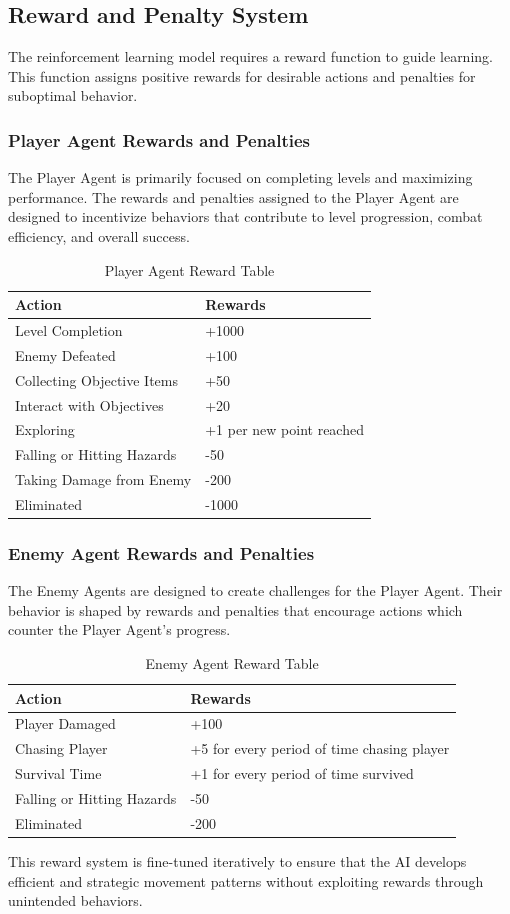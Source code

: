 \documentclass[12pt,oneside,openright,a4paper]{cpe-english-project}
\begin{document}
\subsection{Reward and Penalty System}
The reinforcement learning model requires a reward function to guide learning. This function assigns positive rewards for desirable actions and penalties for suboptimal behavior.
\subsubsection{Player Agent Rewards and Penalties}
The Player Agent is primarily focused on completing levels and maximizing performance. The rewards and penalties assigned to the Player Agent are designed to incentivize behaviors that contribute to level progression, combat efficiency, and overall success.\par
\begin{table}[!h]
\caption{Player Agent Reward Table}\label{tbl:Player Agent Reward Table}
\begin{tabular}{|l|l|} \hline
\textbf{Action} & \textbf{Rewards} \\ \hline
Level Completion & +1000 \\ 
Enemy Defeated & +100 \\ 
Collecting Objective Items & +50 \\ 
Interact with Objectives & +20 \\ 
Exploring & +1 per new point reached \\ 
Falling or Hitting Hazards & -50 \\ 
Taking Damage from Enemy & -200 \\
Eliminated & -1000 \\ \hline
\end{tabular}
\end{table}
\subsubsection{Enemy Agent Rewards and Penalties}
The Enemy Agents are designed to create challenges for the Player Agent. Their behavior is shaped by rewards and penalties that encourage actions which counter the Player Agent's progress.\par
\begin{table}[!h]
\caption{Enemy Agent Reward Table}\label{tbl:Enemy Agent Reward Table}
\begin{tabular}{|l|l|} \hline
\textbf{Action} & \textbf{Rewards} \\ \hline
Player Damaged & +100  \\ 
Chasing Player & +5  for every period of time chasing player \\ 
Survival Time & +1 for every period of time survived \\
Falling or Hitting Hazards & -50 \\ 
Eliminated & -200 \\ \hline
\end{tabular}
\end{table}
This reward system is fine-tuned iteratively to ensure that the AI develops efficient and strategic movement patterns without exploiting rewards through unintended behaviors.\par
\end{document}
